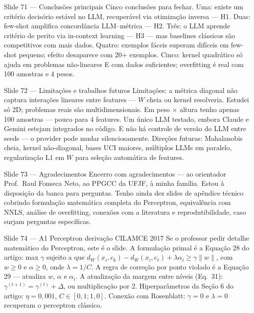 \documentclass[aspectratio=169,10pt]{beamer}
\begin{document}
\begin{frame}{Slide 71 --- Conclus\~oes principais}
\footnotesize
Cinco conclus\~oes para fechar. Uma: existe um crit\'erio decis\'orio est\'avel no LLM, recuper\'avel via otimiza\c{c}\~ao inversa --- H1. Duas: few-shot amplifica concord\^ancia LLM--m\'etrica --- H2. Tr\^es: o LLM aprende crit\'erio de perito via in-context learning --- H3 --- mas baselines cl\'assicos s\~ao competitivos com mais dados. Quatro: exemplos f\'aceis superam dif\'iceis em few-shot pequeno; efeito desaparece com 20+ exemplos. Cinco: kernel quadr\'atico s\'o ajuda em problemas n\~ao-lineares E com dados suficientes; overfitting \'e real com 100 amostras e 4 pesos.
\end{frame}

\begin{frame}{Slide 72 --- Limita\c{c}\~oes e trabalhos futuros}
\footnotesize
Limita\c{c}\~oes: a m\'etrica diagonal n\~ao captura intera\c{c}\~oes lineares entre features --- $W$ cheia ou kernel resolveria. Estudei s\'o 2D; problemas reais s\~ao multidimensionais. Em peso $\times$ altura tenho apenas 100 amostras --- pouco para 4 features. Um \'unico LLM testado, embora Claude e Gemini estejam integrados no c\'odigo. E n\~ao h\'a controle de vers\~ao do LLM entre seeds --- o provider pode mudar silenciosamente. Dire\c{c}\~oes futuras: Mahalanobis cheia, kernel n\~ao-diagonal, bases UCI maiores, m\'ultiplos LLMs em paralelo, regulariza\c{c}\~ao L1 em $W$ para sele\c{c}\~ao autom\'atica de features.
\end{frame}

\begin{frame}{Slide 73 --- Agradecimentos}
\footnotesize
Encerro com agradecimentos --- ao orientador Prof.\ Raul Fonseca Neto, ao PPGCC da UFJF, \`a minha fam\'ilia. Estou \`a disposi\c{c}\~ao da banca para perguntas. Tenho ainda dez slides de ap\^endice t\'ecnico cobrindo formula\c{c}\~ao matem\'atica completa do Perceptron, equival\^encia com NNLS, an\'alise de overfitting, conex\~oes com a literatura e reprodutibilidade, caso surjam perguntas espec\'ificas.
\end{frame}

\begin{frame}{Slide 74 --- A1 Perceptron deriva\c{c}\~ao CILAMCE 2017}
\footnotesize
Se o professor pedir detalhe matem\'atico do Perceptron, este \'e o slide. A formula\c{c}\~ao primal \'e a Equa\c{c}\~ao 28 do artigo: max $\gamma$ sujeito a que $d_W(x_i, c_k) - d_W(x_i, c_\ell) + \lambda \alpha_i \geq \gamma \|w\|$, com $w \geq 0$ e $\alpha \geq 0$, onde $\lambda = 1/C$. A regra de corre\c{c}\~ao por ponto violado \'e a Equa\c{c}\~ao 29 --- atualiza $w$, $\alpha$ e $\alpha_i$. A atualiza\c{c}\~ao da margem entre n\'iveis (Eq.\ 31): $\gamma^{(t+1)} = \gamma^{(t)} + \Delta$, ou multiplica\c{c}\~ao por 2. Hiperpar\^ametros da Se\c{c}\~ao 6 do artigo: $\eta = 0{,}001$, $C \in [0{,}1; 1{,}0]$. Conex\~ao com Rosenblatt: $\gamma = 0$ e $\lambda = 0$ recuperam o perceptron cl\'assico.
\end{frame}
\end{document}
